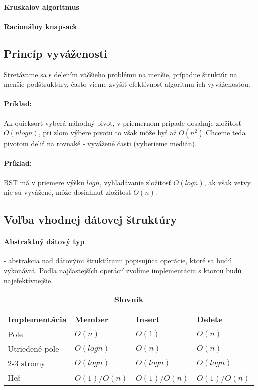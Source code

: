 		\paragraph{Kruskalov algoritmus}
		\paragraph{Racionálny knapsack}
	\subsection{Princíp vyváženosti}
		Stretávame sa s delením väčšieho problému na menšie, prípadne štruktúr na menšie podštruktúry, často vieme zvýšiť efektívnosť algoritmu ich vyváženosťou.
		\paragraph{Príklad:} Ak quicksort vyberá náhodný pivot, v priemernom prípade dosahuje zložitosť $O(n log n)$, pri zlom výbere pivotu to však môže byť až $O(n^{2})$ Chceme teda pivotom deliť na rovnaké - vyvážené časti (vyberieme medián).\\
		\paragraph{Príklad:} BST má v priemere výšku $log n$, vyhľadávanie zložitosť $O(log n)$, ak však vetvy nie sú vyvážené, môže dosiahnuť zložitosť $O(n)$.
	

	\subsection{Voľba vhodnej dátovej štruktúry}
		\paragraph{Abstraktný dátový typ} - abstrakcia nad dátovými štruktúrami popisujúca operácie, ktoré sa budú vykonávať. Podľa najčastejších operácií zvolíme implementáciu s ktorou budú najefektívnejšie.\\

		\begin{table}[h]
			\centering
			\caption{\textbf{Slovník}}
			\label{my-label}
			\begin{tabular}{|l|l|l|l|}
			\hline
			\textbf{Implementácia} & \textbf{Member} & \textbf{Insert} & \textbf{Delete}  \\ \hline
			Pole                   & $O(n)$            & $O(1)$           & $O(n)$             \\ \hline
			Utriedené pole         & $O(log n)$        & $O(n)$            & $O(n)$             \\ \hline
			2-3 stromy             & $O(log n)$        & $O(log n)$        & $O(log n)$          \\ \hline
			Heš                    & $O(1)$/$O(n)$      & $O(1)$/$O(n)$       & $O(1)$/$O(n)$        \\ \hline
			\end{tabular}
		\end{table}

